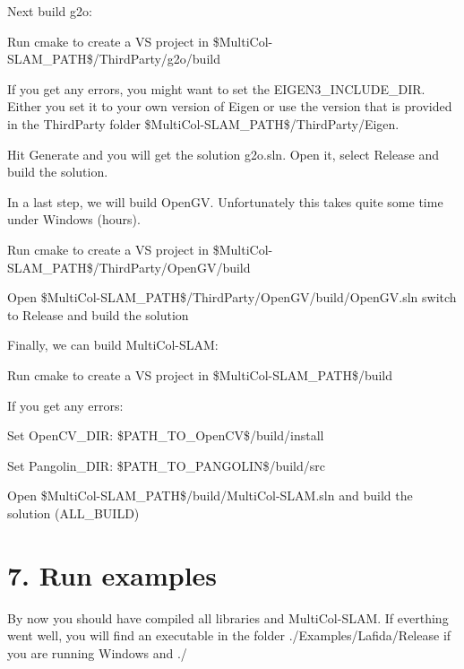 Next build g2o\+:
\begin{DoxyItemize}
\item Run cmake to create a VS project in \$\+Multi\+Col-\/\+S\+L\+A\+M\+\_\+\+P\+A\+TH\$/\+Third\+Party/g2o/build
\item If you get any errors, you might want to set the E\+I\+G\+E\+N3\+\_\+\+I\+N\+C\+L\+U\+D\+E\+\_\+\+D\+IR. Either you set it to your own version of Eigen or use the version that is provided in the Third\+Party folder \$\+Multi\+Col-\/\+S\+L\+A\+M\+\_\+\+P\+A\+TH\$/\+Third\+Party/\+Eigen.
\item Hit Generate and you will get the solution g2o.\+sln. Open it, select Release and build the solution.
\end{DoxyItemize}

In a last step, we will build Open\+GV. Unfortunately this takes quite some time under Windows (hours).
\begin{DoxyItemize}
\item Run cmake to create a VS project in \$\+Multi\+Col-\/\+S\+L\+A\+M\+\_\+\+P\+A\+TH\$/\+Third\+Party/\+Open\+G\+V/build
\item Open \$\+Multi\+Col-\/\+S\+L\+A\+M\+\_\+\+P\+A\+TH\$/\+Third\+Party/\+Open\+G\+V/build/\+Open\+GV.sln switch to Release and build the solution
\end{DoxyItemize}

Finally, we can build Multi\+Col-\/\+S\+L\+AM\+:
\begin{DoxyItemize}
\item Run cmake to create a VS project in \$\+Multi\+Col-\/\+S\+L\+A\+M\+\_\+\+P\+A\+TH\$/build
\item If you get any errors\+:
\item Set Open\+C\+V\+\_\+\+D\+IR\+: \$\+P\+A\+T\+H\+\_\+\+T\+O\+\_\+\+Open\+CV\$/build/install
\item Set Pangolin\+\_\+\+D\+IR\+: \$\+P\+A\+T\+H\+\_\+\+T\+O\+\_\+\+P\+A\+N\+G\+O\+L\+IN\$/build/src
\item Open \$\+Multi\+Col-\/\+S\+L\+A\+M\+\_\+\+P\+A\+TH\$/build/\+Multi\+Col-\/\+S\+L\+AM.sln and build the solution (A\+L\+L\+\_\+\+B\+U\+I\+LD)
\end{DoxyItemize}

\section*{7. Run examples}

By now you should have compiled all libraries and Multi\+Col-\/\+S\+L\+AM. If everthing went well, you will find an executable in the folder ./\+Examples/\+Lafida/\+Release if you are running Windows and ./

